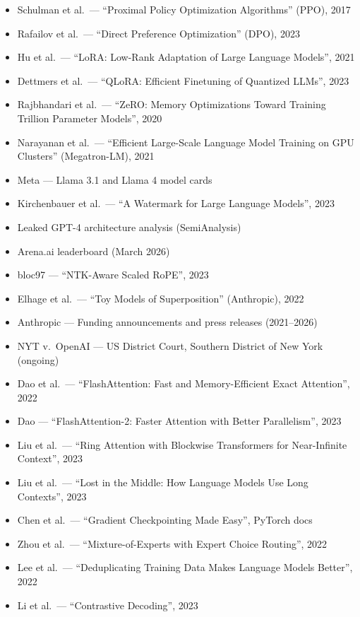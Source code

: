 \documentclass[11pt,a4paper]{article}
\begin{document}
\begin{itemize}
  \item Schulman et al.\ --- ``Proximal Policy Optimization Algorithms'' (PPO), 2017
  \item Rafailov et al.\ --- ``Direct Preference Optimization'' (DPO), 2023
  \item Hu et al.\ --- ``LoRA: Low-Rank Adaptation of Large Language Models'', 2021
  \item Dettmers et al.\ --- ``QLoRA: Efficient Finetuning of Quantized LLMs'', 2023
  \item Rajbhandari et al.\ --- ``ZeRO: Memory Optimizations Toward Training Trillion Parameter Models'', 2020
  \item Narayanan et al.\ --- ``Efficient Large-Scale Language Model Training on GPU Clusters'' (Megatron-LM), 2021
  \item Meta --- Llama 3.1 and Llama 4 model cards
  \item Kirchenbauer et al.\ --- ``A Watermark for Large Language Models'', 2023
  \item Leaked GPT-4 architecture analysis (SemiAnalysis)
  \item Arena.ai leaderboard (March 2026)
  \item bloc97 --- ``NTK-Aware Scaled RoPE'', 2023
  \item Elhage et al.\ --- ``Toy Models of Superposition'' (Anthropic), 2022
  \item Anthropic --- Funding announcements and press releases (2021--2026)
  \item NYT v.\ OpenAI --- US District Court, Southern District of New York (ongoing)
  \item Dao et al.\ --- ``FlashAttention: Fast and Memory-Efficient Exact Attention'', 2022
  \item Dao --- ``FlashAttention-2: Faster Attention with Better Parallelism'', 2023
  \item Liu et al.\ --- ``Ring Attention with Blockwise Transformers for Near-Infinite Context'', 2023
  \item Liu et al.\ --- ``Lost in the Middle: How Language Models Use Long Contexts'', 2023
  \item Chen et al.\ --- ``Gradient Checkpointing Made Easy'', PyTorch docs
  \item Zhou et al.\ --- ``Mixture-of-Experts with Expert Choice Routing'', 2022
  \item Lee et al.\ --- ``Deduplicating Training Data Makes Language Models Better'', 2022
  \item Li et al.\ --- ``Contrastive Decoding'', 2023

\end{itemize}
\end{document}
